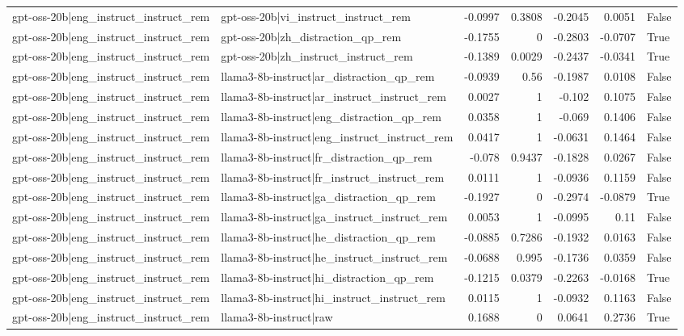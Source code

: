 \begin{table}
\begin{tabular}{l l r r r r l}
gpt-oss-20b|eng_instruct_instruct_rem & gpt-oss-20b|vi_instruct_instruct_rem & -0.0997 & 0.3808 & -0.2045 & 0.0051 & False \\
gpt-oss-20b|eng_instruct_instruct_rem & gpt-oss-20b|zh_distraction_qp_rem & -0.1755 & 0 & -0.2803 & -0.0707 & True \\
gpt-oss-20b|eng_instruct_instruct_rem & gpt-oss-20b|zh_instruct_instruct_rem & -0.1389 & 0.0029 & -0.2437 & -0.0341 & True \\
gpt-oss-20b|eng_instruct_instruct_rem & llama3-8b-instruct|ar_distraction_qp_rem & -0.0939 & 0.56 & -0.1987 & 0.0108 & False \\
gpt-oss-20b|eng_instruct_instruct_rem & llama3-8b-instruct|ar_instruct_instruct_rem & 0.0027 & 1 & -0.102 & 0.1075 & False \\
gpt-oss-20b|eng_instruct_instruct_rem & llama3-8b-instruct|eng_distraction_qp_rem & 0.0358 & 1 & -0.069 & 0.1406 & False \\
gpt-oss-20b|eng_instruct_instruct_rem & llama3-8b-instruct|eng_instruct_instruct_rem & 0.0417 & 1 & -0.0631 & 0.1464 & False \\
gpt-oss-20b|eng_instruct_instruct_rem & llama3-8b-instruct|fr_distraction_qp_rem & -0.078 & 0.9437 & -0.1828 & 0.0267 & False \\
gpt-oss-20b|eng_instruct_instruct_rem & llama3-8b-instruct|fr_instruct_instruct_rem & 0.0111 & 1 & -0.0936 & 0.1159 & False \\
gpt-oss-20b|eng_instruct_instruct_rem & llama3-8b-instruct|ga_distraction_qp_rem & -0.1927 & 0 & -0.2974 & -0.0879 & True \\
gpt-oss-20b|eng_instruct_instruct_rem & llama3-8b-instruct|ga_instruct_instruct_rem & 0.0053 & 1 & -0.0995 & 0.11 & False \\
gpt-oss-20b|eng_instruct_instruct_rem & llama3-8b-instruct|he_distraction_qp_rem & -0.0885 & 0.7286 & -0.1932 & 0.0163 & False \\
gpt-oss-20b|eng_instruct_instruct_rem & llama3-8b-instruct|he_instruct_instruct_rem & -0.0688 & 0.995 & -0.1736 & 0.0359 & False \\
gpt-oss-20b|eng_instruct_instruct_rem & llama3-8b-instruct|hi_distraction_qp_rem & -0.1215 & 0.0379 & -0.2263 & -0.0168 & True \\
gpt-oss-20b|eng_instruct_instruct_rem & llama3-8b-instruct|hi_instruct_instruct_rem & 0.0115 & 1 & -0.0932 & 0.1163 & False \\
gpt-oss-20b|eng_instruct_instruct_rem & llama3-8b-instruct|raw & 0.1688 & 0 & 0.0641 & 0.2736 & True \\

\end{tabular}
\end{table}
